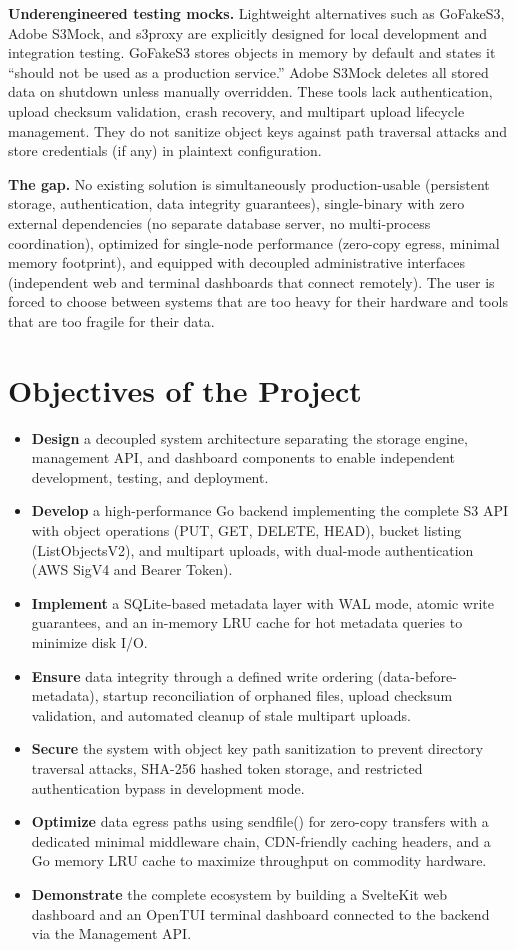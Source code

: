\documentclass[12pt,a4paper]{report}
\begin{document}
\textbf{Underengineered testing mocks.} Lightweight alternatives such as GoFakeS3, Adobe S3Mock, and s3proxy are explicitly designed for local development and integration testing. GoFakeS3 stores objects in memory by default and states it ``should not be used as a production service.'' Adobe S3Mock deletes all stored data on shutdown unless manually overridden. These tools lack authentication, upload checksum validation, crash recovery, and multipart upload lifecycle management. They do not sanitize object keys against path traversal attacks and store credentials (if any) in plaintext configuration.

\textbf{The gap.} No existing solution is simultaneously production-usable (persistent storage, authentication, data integrity guarantees), single-binary with zero external dependencies (no separate database server, no multi-process coordination), optimized for single-node performance (zero-copy egress, minimal memory footprint), and equipped with decoupled administrative interfaces (independent web and terminal dashboards that connect remotely). The user is forced to choose between systems that are too heavy for their hardware and tools that are too fragile for their data.
\section{Objectives of the Project}
\begin{itemize}
\item \textbf{Design} a decoupled system architecture separating the storage engine, management API, and dashboard components to enable independent development, testing, and deployment.
\item \textbf{Develop} a high-performance Go backend implementing the complete S3 API with object operations (PUT, GET, DELETE, HEAD), bucket listing (ListObjectsV2), and multipart uploads, with dual-mode authentication (AWS SigV4 and Bearer Token).
\item \textbf{Implement} a SQLite-based metadata layer with WAL mode, atomic write guarantees, and an in-memory LRU cache for hot metadata queries to minimize disk I/O.
\item \textbf{Ensure} data integrity through a defined write ordering (data-before-metadata), startup reconciliation of orphaned files, upload checksum validation, and automated cleanup of stale multipart uploads.
\item \textbf{Secure} the system with object key path sanitization to prevent directory traversal attacks, SHA-256 hashed token storage, and restricted authentication bypass in development mode.
\item \textbf{Optimize} data egress paths using sendfile() for zero-copy transfers with a dedicated minimal middleware chain, CDN-friendly caching headers, and a Go memory LRU cache to maximize throughput on commodity hardware.
\item \textbf{Demonstrate} the complete ecosystem by building a SvelteKit web dashboard and an OpenTUI terminal dashboard connected to the backend via the Management API.
\end{itemize}
\newpage
\end{document}
